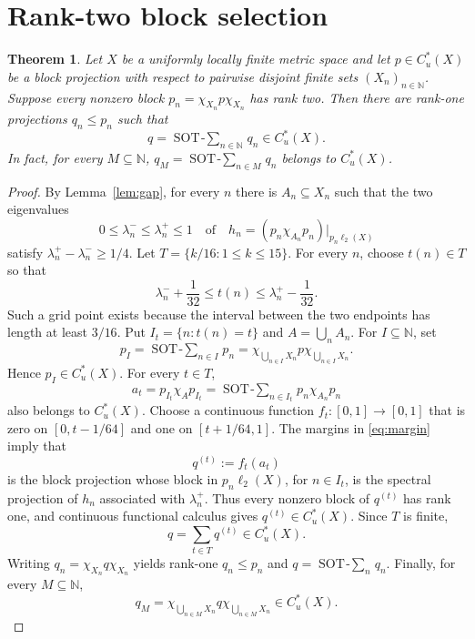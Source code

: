\documentclass[11pt]{article}
\newtheorem{theorem}{Theorem}
\newcommand{\Cu}{C_u^*}
\newcommand{\ellTwo}{\ell_2}
\newcommand{\SOT}{\mathop{\mathrm{SOT}\!-\!\sum}}
\begin{document}
\section{Rank-two block selection}
\begin{theorem}\label{thm:main}
Let $X$ be a uniformly locally finite metric space and let
$p\in\Cu(X)$ be a block projection with respect to pairwise disjoint
finite sets $(X_n)_{n\in\mathbb N}$. Suppose every nonzero block
$p_n=\chi_{X_n}p\chi_{X_n}$ has rank two. Then there are rank-one
projections $q_n\leq p_n$ such that
\[
 q=\SOT_{n\in\mathbb N}q_n\in\Cu(X).
\]
In fact, for every $M\subseteq\mathbb N$,
$q_M=\SOT_{n\in M}q_n$ belongs to $\Cu(X)$.
\end{theorem}
\begin{proof}
By Lemma~\ref{lem:gap}, for every $n$ there is $A_n\subseteq X_n$ such
that the two eigenvalues
\[
0\leq\lambda_n^-\leq\lambda_n^+\leq1
\quad\text{of}\quad h_n=(p_n\chi_{A_n}p_n)|_{p_n\ellTwo(X)}
\]
satisfy $\lambda_n^+-\lambda_n^-\geq1/4$.
Let $T=\{k/16:1\leq k\leq15\}$. For every $n$, choose
$t(n)\in T$ so that
\begin{equation}\label{eq:margin}
\lambda_n^-+\frac1{32}\leq t(n)\leq\lambda_n^+-\frac1{32}.
\end{equation}
Such a grid point exists because the interval between the two endpoints has
length at least $3/16$. Put $I_t=\{n:t(n)=t\}$ and $A=\bigcup_nA_n$.
For $I\subseteq\mathbb N$, set
\[
p_I=\SOT_{n\in I}p_n
=\chi_{\bigcup_{n\in I}X_n}p\chi_{\bigcup_{n\in I}X_n}.
\]
Hence $p_I\in\Cu(X)$. For every $t\in T$,
\[
a_t=p_{I_t}\chi_Ap_{I_t}
=\SOT_{n\in I_t}p_n\chi_{A_n}p_n
\]
also belongs to $\Cu(X)$. Choose a continuous function
$f_t:[0,1]\to[0,1]$ that is zero on $[0,t-1/64]$ and one on
$[t+1/64,1]$. The margins in \eqref{eq:margin} imply that
\[
q^{(t)}:=f_t(a_t)
\]
is the block projection whose block in $p_n\ellTwo(X)$, for $n\in I_t$,
is the spectral projection of $h_n$ associated with $\lambda_n^+$.
Thus every nonzero block of $q^{(t)}$ has rank one, and continuous
functional calculus gives $q^{(t)}\in\Cu(X)$.
Since $T$ is finite,
\[
q=\sum_{t\in T}q^{(t)}\in\Cu(X).
\]
Writing $q_n=\chi_{X_n}q\chi_{X_n}$ yields rank-one $q_n\leq p_n$ and
$q=\SOT_nq_n$. Finally, for every $M\subseteq\mathbb N$,
\[
q_M=\chi_{\bigcup_{n\in M}X_n}q\chi_{\bigcup_{n\in M}X_n}\in\Cu(X).
\]
\end{proof}
\end{document}
